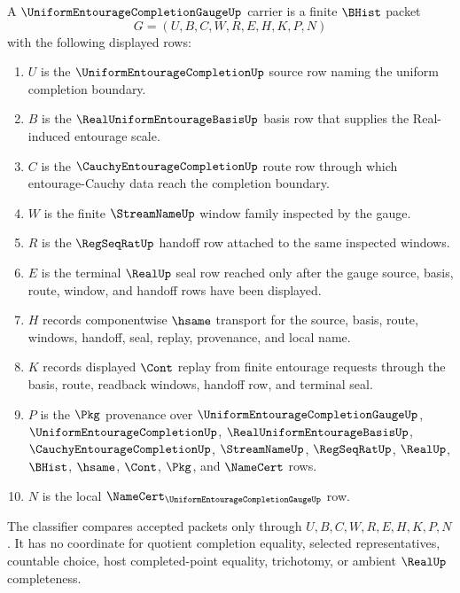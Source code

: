 \begin{definition}
\label{def:uniform-entourage-completion-gauge-carrier}
A $\UniformEntourageCompletionGaugeUp$ carrier is a finite $\BHist$ packet
$$
G=(U,B,C,W,R,E,H,K,P,N)
$$
with the following displayed rows:
\begin{enumerate}
\item $U$ is the $\UniformEntourageCompletionUp$ source row naming the uniform completion boundary.
\item $B$ is the $\RealUniformEntourageBasisUp$ basis row that supplies the Real-induced entourage scale.
\item $C$ is the $\CauchyEntourageCompletionUp$ route row through which entourage-Cauchy data reach the completion boundary.
\item $W$ is the finite $\StreamNameUp$ window family inspected by the gauge.
\item $R$ is the $\RegSeqRatUp$ handoff row attached to the same inspected windows.
\item $E$ is the terminal $\RealUp$ seal row reached only after the gauge source, basis, route, window, and handoff rows have been displayed.
\item $H$ records componentwise $\hsame$ transport for the source, basis, route, windows, handoff, seal, replay, provenance, and local name.
\item $K$ records displayed $\Cont$ replay from finite entourage requests through the basis, route, readback windows, handoff row, and terminal seal.
\item $P$ is the $\Pkg$ provenance over $\UniformEntourageCompletionGaugeUp$, $\UniformEntourageCompletionUp$, $\RealUniformEntourageBasisUp$, $\CauchyEntourageCompletionUp$, $\StreamNameUp$, $\RegSeqRatUp$, $\RealUp$, $\BHist$, $\hsame$, $\Cont$, $\Pkg$, and $\NameCert$ rows.
\item $N$ is the local $\NameCert_{\UniformEntourageCompletionGaugeUp}$ row.
\end{enumerate}
The classifier compares accepted packets only through $U,B,C,W,R,E,H,K,P,N$. It has no coordinate for quotient completion equality, selected representatives, countable choice, host completed-point equality, trichotomy, or ambient $\RealUp$ completeness.
\end{definition}

